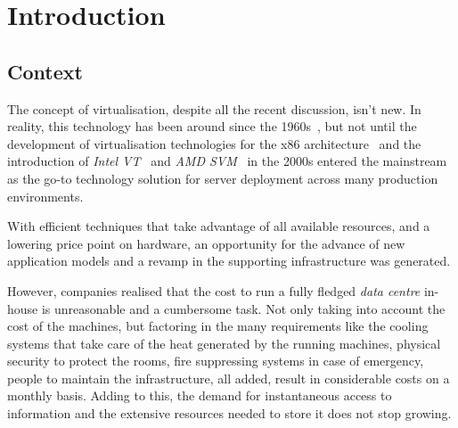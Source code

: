 \newcommand{\novathesis}{\emph{novathesis}}
\newcommand{\novathesisclass}{\texttt{novathesis.cls}}


\chapter{Introduction}
\label{cha:introduction}



\section{Context} %
\label{sec:context}

The concept of virtualisation, despite all the recent discussion, isn’t new. In reality, this technology has been around since the 1960s~\cite{Buzen1973}, but not until the development of virtualisation technologies for the x86 architecture~\cite{Agesen2010} and the introduction of \textit{Intel VT}~\cite{Intel2010} and \textit{AMD SVM}~\cite{AMD2010} in the 2000s entered the mainstream as the go-to technology solution for server deployment across many production environments. 

With efficient techniques that take advantage of all available resources, and a lowering price point on hardware, an opportunity for the advance of new application models and a revamp in the supporting infrastructure was generated. 

However, companies realised that the cost to run a fully fledged \textit{data centre} in-house is unreasonable and a cumbersome task. Not only taking into account the cost of the machines, but factoring in the many requirements like the cooling systems that take care of the heat generated by the running machines, physical security to protect the rooms, fire suppressing systems in case of emergency, people to maintain the infrastructure, all added, result in considerable costs on a monthly basis.
Adding to this, the demand for instantaneous access to information and the extensive resources needed to store it does not stop growing.

